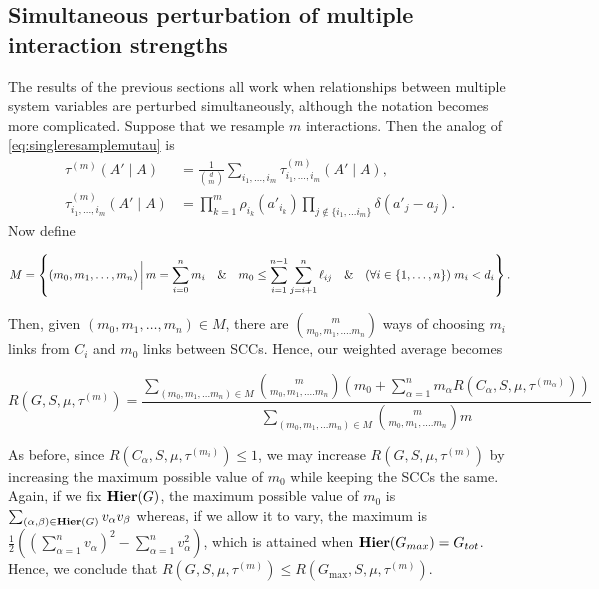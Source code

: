\subsection{Simultaneous perturbation of multiple interaction strengths}
The results of the previous sections all work when relationships between multiple system variables are perturbed simultaneously,
although the notation becomes more complicated.  Suppose that we
resample $m$ interactions.  Then the analog of \ref{eq:singleresamplemutau} is
\begin{equation}\label{eq:multipleresamplemutau}
\begin{aligned}
\tau^{(m)}(A' \mid A) &= \frac{1}{\binom{d}{m}} \sum_{i_1, \ldots, i_m}
  \tau^{(m)}_{i_1, \ldots, i_m} (A' \mid A), \\
\tau^{(m)}_{i_1, \ldots, i_m} (A' \mid A) &=
 \prod_{k=1}^m \rho_{i_k} (a'_{i_k})
 \prod_{j \notin \{i_1, \ldots i_m\}} \delta(a'_j - a_j).
\end{aligned}
\end{equation}
Now define
\begin{widetext}
\begin{equation*}
M = \left\{(m_0, m_1, \ldots, m_n) \,\bigg|\,
m = \sum_{i=0}^n m_i \quad\&\quad
m_0 \le \sum_{i=1}^{n-1} \sum_{j=i+1}^n \ell_{ij} \quad\&\quad
(\forall i \in \{1, \ldots, n\}) \; m_i < d_i \right\}.
\end{equation*}
\end{widetext}
Then, given $(m_0, m_1, \ldots, m_n) \in M$, there are ${m \choose
m_0, m_1, \ldots. m_n}$ ways of choosing $m_i$ links from $C_i$ and
$m_0$ links between SCCs.  Hence, our
weighted average becomes
\begin{widetext}
\begin{equation}\label{eq:robustnessmultiple}
R(G, S, \mu, \tau^{(m)}) =
\frac{\sum\limits_{(m_0, m_1, \ldots m_n) \in M}
      {m \choose m_0, m_1, \ldots. m_n}
      \left(m_0 + \sum\limits_{\alpha=1}^n m_\alpha R(C_\alpha, S, \mu, \tau^{(m_\alpha)}) \right)}
     {\sum\limits_{(m_0, m_1, \ldots m_n) \in M}
      {m \choose m_0, m_1, \ldots. m_n} m}
\end{equation}
\end{widetext}

As before, since $R(C_\alpha, S, \mu, \tau^{(m_i)}) \le 1$, we may
increase $R(G, S, \mu, \tau^{(m)})$ by increasing the maximum
possible value of $m_0$ while keeping the SCCs the same.  Again, if we fix $\mathbf{Hier}(G)$, the maximum
possible value of $m_0$ is $\sum_{(\alpha,\beta) \in \mathbf{Hier}(G)} v_\alpha v_\beta$
whereas, if we allow it to vary, the maximum is $\frac{1}{2} ((\sum_{\alpha=1}^n
v_\alpha)^2 - \sum_{\alpha=1}^n v_\alpha^2)$, which is attained when $\mathbf{Hier}(G_{max}) =
G_{tot}$.  Hence, we conclude that $R(G, S, \mu, \tau^{(m)}) \le
R(G_{\mathrm{max}}, S, \mu, \tau^{(m)})$.

